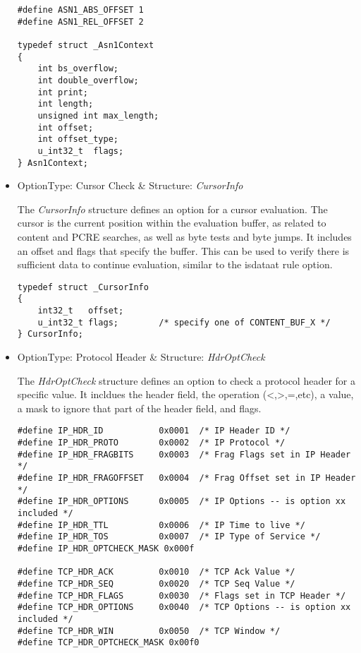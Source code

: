 \documentclass[english]{report}
\begin{document}
\begin{itemize}
\begin{verbatim}
#define ASN1_ABS_OFFSET 1
#define ASN1_REL_OFFSET 2

typedef struct _Asn1Context
{
    int bs_overflow;
    int double_overflow;
    int print;
    int length;
    unsigned int max_length;
    int offset;
    int offset_type;
    u_int32_t  flags;
} Asn1Context;
\end{verbatim}

\item {OptionType: Cursor Check \& Structure: {\em CursorInfo}}

The {\em CursorInfo} structure defines an option for a cursor evaluation.  The
cursor is the current position within the evaluation buffer, as related to
content and PCRE searches, as well as byte tests and byte jumps.  It includes
an offset and flags that specify the buffer.  This can be used to verify there
is sufficient data to continue evaluation, similar to the isdataat rule option.  

\begin{verbatim}
typedef struct _CursorInfo
{
    int32_t   offset;
    u_int32_t flags;        /* specify one of CONTENT_BUF_X */
} CursorInfo;
\end{verbatim}

\item {OptionType: Protocol Header \& Structure: {\em HdrOptCheck}}

The {\em HdrOptCheck} structure defines an option to check a protocol header
for a specific value.  It incldues the header field, the operation (<,>,=,etc),
a value, a mask to ignore that part of the header field, and flags.

\begin{verbatim}
#define IP_HDR_ID           0x0001  /* IP Header ID */
#define IP_HDR_PROTO        0x0002  /* IP Protocol */
#define IP_HDR_FRAGBITS     0x0003  /* Frag Flags set in IP Header */
#define IP_HDR_FRAGOFFSET   0x0004  /* Frag Offset set in IP Header */
#define IP_HDR_OPTIONS      0x0005  /* IP Options -- is option xx included */
#define IP_HDR_TTL          0x0006  /* IP Time to live */
#define IP_HDR_TOS          0x0007  /* IP Type of Service */
#define IP_HDR_OPTCHECK_MASK 0x000f

#define TCP_HDR_ACK         0x0010  /* TCP Ack Value */
#define TCP_HDR_SEQ         0x0020  /* TCP Seq Value */
#define TCP_HDR_FLAGS       0x0030  /* Flags set in TCP Header */
#define TCP_HDR_OPTIONS     0x0040  /* TCP Options -- is option xx included */
#define TCP_HDR_WIN         0x0050  /* TCP Window */
#define TCP_HDR_OPTCHECK_MASK 0x00f0


\end{verbatim}
\end{itemize}
\end{document}
